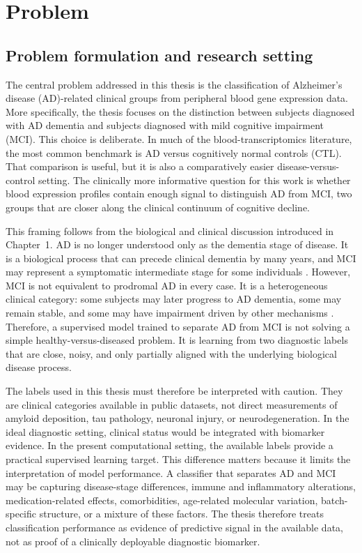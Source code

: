 \chapter{Problem}
\label{ch:problem}

\section{Problem formulation and research setting}
\label{sec:problem-formulation}

The central problem addressed in this thesis is the classification of Alzheimer's disease (AD)-related clinical groups from peripheral blood gene expression data. More specifically, the thesis focuses on the distinction between subjects diagnosed with AD dementia and subjects diagnosed with mild cognitive impairment (MCI). This choice is deliberate. In much of the blood-transcriptomics literature, the most common benchmark is AD versus cognitively normal controls (CTL). That comparison is useful, but it is also a comparatively easier disease-versus-control setting. The clinically more informative question for this work is whether blood expression profiles contain enough signal to distinguish AD from MCI, two groups that are closer along the clinical continuum of cognitive decline.

This framing follows from the biological and clinical discussion introduced in Chapter~1. AD is no longer understood only as the dementia stage of disease. It is a biological process that can precede clinical dementia by many years, and MCI may represent a symptomatic intermediate stage for some individuals \cite{jack2018nia,albert2011diagnosis}. However, MCI is not equivalent to prodromal AD in every case. It is a heterogeneous clinical category: some subjects may later progress to AD dementia, some may remain stable, and some may have impairment driven by other mechanisms \cite{petersen2004mci}. Therefore, a supervised model trained to separate AD from MCI is not solving a simple healthy-versus-diseased problem. It is learning from two diagnostic labels that are close, noisy, and only partially aligned with the underlying biological disease process.

The labels used in this thesis must therefore be interpreted with caution. They are clinical categories available in public datasets, not direct measurements of amyloid deposition, tau pathology, neuronal injury, or neurodegeneration. In the ideal diagnostic setting, clinical status would be integrated with biomarker evidence. In the present computational setting, the available labels provide a practical supervised learning target. This difference matters because it limits the interpretation of model performance. A classifier that separates AD and MCI may be capturing disease-stage differences, immune and inflammatory alterations, medication-related effects, comorbidities, age-related molecular variation, batch-specific structure, or a mixture of these factors. The thesis therefore treats classification performance as evidence of predictive signal in the available data, not as proof of a clinically deployable diagnostic biomarker.

